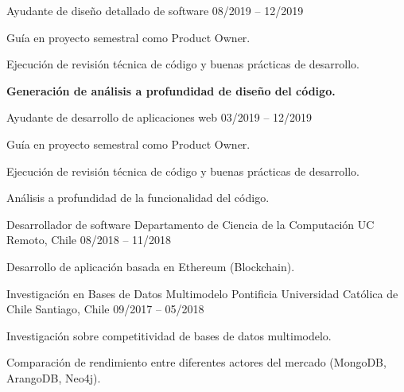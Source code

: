 \begin{cventries}
  \cventry
    {Ayudante de diseño detallado de software} %
    { } %
    { } %
    {08/2019 – 12/2019} %
    {
      \begin{cvitems} %
        \item {Guía en proyecto semestral como Product Owner.}
        \item {Ejecución de revisión técnica de código y buenas prácticas de desarrollo.}
        \item {\textbf{Generación de análisis a profundidad de diseño del código.}}
      \end{cvitems}
    }
    \newline

  \cventry
    {Ayudante de desarrollo de aplicaciones web} %
    { } %
    { } %
    {03/2019 – 12/2019} %
    {
      \begin{cvitems} %
        \item {Guía en proyecto semestral como Product Owner.}
        \item {Ejecución de revisión técnica de código y buenas prácticas de desarrollo.}
        \item {Análisis a profundidad de la funcionalidad del código.}
      \end{cvitems}
    }
    \newline

  \cventry
    {Desarrollador de software} %
    {Departamento de Ciencia de la Computación UC} %
    {Remoto, Chile} %
    {08/2018 – 11/2018} %
    {
      \begin{cvitems} %
        \item {Desarrollo de aplicación basada en Ethereum (Blockchain).}
      \end{cvitems}
    }
    \newline

  \cventry
    {Investigación en Bases de Datos Multimodelo} %
    {Pontificia Universidad Católica de Chile} %
    {Santiago, Chile} %
    {09/2017 – 05/2018} %
    {
      \begin{cvitems} %
        \item {Investigación sobre competitividad de bases de datos multimodelo.}
        \item {Comparación de rendimiento entre diferentes actores del mercado (MongoDB, ArangoDB, Neo4j).}
      \end{cvitems} 
    }

\end{cventries}

